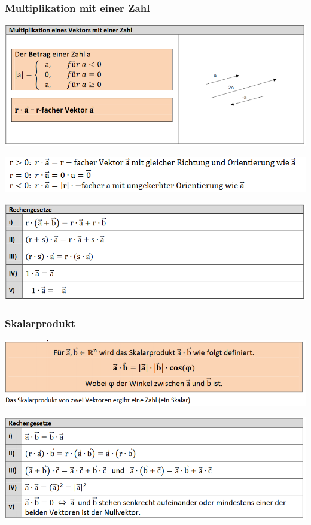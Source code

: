 \subsubsection{Multiplikation mit einer Zahl}
\includegraphics[scale=0.7]{vec3.PNG}

\includegraphics[scale=0.7]{vec3-1.PNG}

\includegraphics[scale=0.7]{vec3-2.PNG}

\subsubsection{Skalarprodukt}
\includegraphics[scale=0.7]{vec4.PNG}

\includegraphics[scale=0.7]{vec4-1.PNG}

